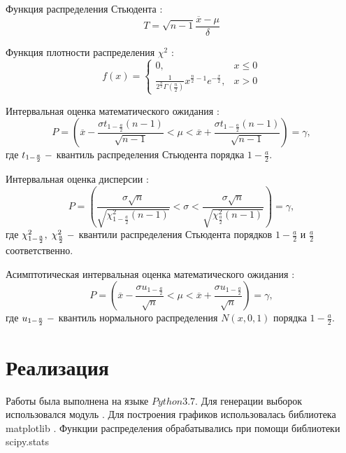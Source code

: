 \documentclass[12pt]{report}
\begin{document}
Функция распределения Стьюдента \cite{8_2}:
\begin{equation}
    T = \sqrt{n-1}\frac{\overline{x}-\mu}{\delta}
\end{equation}

Функция плотности распределения $\chi^2$ \cite{8_3}:
\begin{equation}
    f(x) = \begin{cases}
    0,&x\leq 0\\
    \frac{1}{2^\frac{n}{2}\Gamma\left(\frac{n}{2}\right)}x^{\frac{n}{2}-1}e^{-\frac{x}{2}},& x>0
    \end{cases}
\end{equation}

Интервальная оценка математического ожидания \cite{8_4}:
\begin{equation}
    P=\left(\overline{x}-\frac{\sigma t_{1-\frac{a}{2}}(n-1)}{\sqrt{n-1}}<\mu<\overline{x}+\frac{\sigma t_{1-\frac{a}{2}}(n-1)}{\sqrt{n-1}}\right) = \gamma,
\end{equation}
где $t_{1-\frac{a}{2}}\;\--$ квантиль распределения Стьюдента порядка $1-\frac{a}{2}.$

Интервальная оценка дисперсии \cite{8_2}:
\begin{equation}
    P=\left(\frac{\sigma\sqrt{n}}{\sqrt{\chi^2_{1-\frac{a}{2}}(n-1)}}<\sigma<\frac{\sigma\sqrt{n}}{\sqrt{\chi^2_\frac{a}{2}(n-1)}}\right) = \gamma,
\end{equation}
где $\chi_{1-\frac{a}{2}}^2,\;\chi_\frac{a}{2}^2\;\--$ квантили распределения Стьюдента порядков $1-\frac{a}{2}$ и $\frac{a}{2}$ соответственно.

Асимптотическая интервальная оценка математического ожидания \cite{8_2}:
\begin{equation}
    P = \left(\overline{x}-\frac{\sigma u_{1-\frac{a}{2}}}{\sqrt{n}}<\mu<\overline{x}+\frac{\sigma u_{1-\frac{a}{2}}}{\sqrt{n}}\right)=\gamma,
\end{equation}
где $u_{1-\frac{a}{2}}\;\--$ квантиль нормального распределения $N(x,0,1)$ порядка $1-\frac{a}{2}.$


\section{Реализация}
Работы была выполнена на языке $Python 3.7.$
Для генерации выборок использовался модуль \cite{numpy}.
Для построения графиков использовалась библиотека matplotlib \cite{plotlib}.
Функции распределения обрабатывались при помощи библиотеки scipy.stats \cite{skp}
\end{document}

